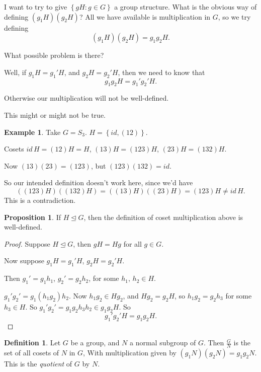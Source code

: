 \documentclass{article}
\theoremstyle{definition}
\newtheorem*{definition}{Definition}
\newtheorem{proposition}[theorem]{Proposition}
\newtheorem*{exmp}{Example}
\begin{document}
I want to try to give $\left\{ gH:g\in G \right\}$ a group structure. What is the obvious way of defining $(g_1 H)(g_2 H)$? All we have available is multiplication in $G$, so we try defining
\[
  (g_1 H )(g_2 H) = g_1 g_2 H.
\]

What possible problem is there? 

Well, if $g_1 H=g_1'H$, and $g_2 H=g_2' H$, then we need to know that
\[
  g_1g_2 H = g_1' g_2' H.
\]

Otherwise our multiplication will not be well-defined.

This might or might not be true.\\

\begin{exmp}
  Take $G = S_3$. $H = \left\{ id, (12) \right\}$.

  Cosets $id\, H=(12)H=H$, $(13)H=(123)H$, $(23)H=(132)H$.

  Now $(13)(23)=(123)$, but $(123)(132)=id$.

  So our intended definition doesn't work here, since we'd have 
  \[
    ((123)H)((132)H)=((13)H)(\left( 23 \right)H)=(123)H \neq id\,H.
  \]
  This is a contradiction.\\
\end{exmp}

\begin{proposition}
  If $H \trianglelefteq G$, then the definition of coset multiplication above is well-defined.
\end{proposition}

\begin{proof}
  Suppose $H \trianglelefteq G$, then $gH=Hg$ for all $g \in G$.

  Now suppose $g_1H=g_1'H$, $g_2H=g_2'H$.

  Then $g_1' = g_1h_1$, $g_2'=g_2h_2$, for some $h_1,\,h_2 \in H$.

  $g_1'g_2'=g_1(h_1g_2)h_2$. Now $h_1g_2 \in Hg_2$, and $Hg_2=g_2H$, so $h_1g_2=g_2h_3$ for some $h_3 \in H$. So $g_1'g_2'=g_1g_2h_3h_2 \in g_1g_2H$. So
  \[
    g_1'g_2'H = g_1g_2H.
  \]
\end{proof}

\begin{definition}
  Let $G$ be a group, and $N$ a normal subgroup of $G$. Then $\frac{G}{N}$ is the set of all cosets of $N$ in $G$, With multiplication given by $(g_1N)(g_2N)=g_1g_2N$. This is the \emph{quotient} of $G$ by $N$.\\
\end{definition}
\end{document}
